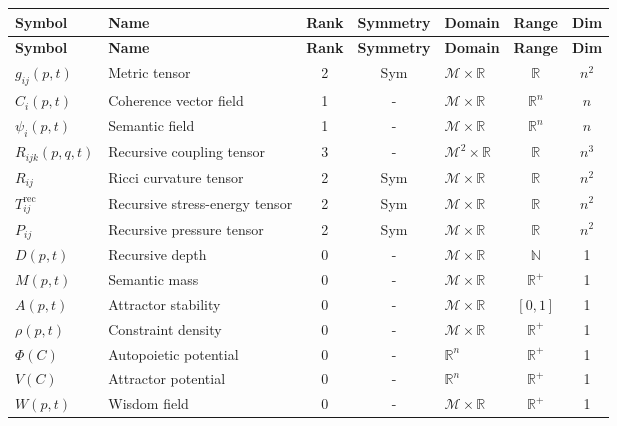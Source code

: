 {\footnotesize
\begin{longtable}{|p{2.5cm}|p{4cm}|c|c|p{2.5cm}|c|c|}
\hline
\textbf{Symbol} & \textbf{Name} & \textbf{Rank} & \textbf{Symmetry} & \textbf{Domain} & \textbf{Range} & \textbf{Dim} \\
\hline
\endfirsthead
\hline
\textbf{Symbol} & \textbf{Name} & \textbf{Rank} & \textbf{Symmetry} & \textbf{Domain} & \textbf{Range} & \textbf{Dim} \\
\hline
\endhead
\hline
\(g_{ij}(p,t)\) & Metric tensor & 2 & Sym & \(\mathcal{M} \times \mathbb{R}\) & \(\mathbb{R}\) & \(n^2\) \\
\hline
\(C_i(p,t)\) & Coherence vector field & 1 & - & \(\mathcal{M} \times \mathbb{R}\) & \(\mathbb{R}^n\) & \(n\) \\
\hline
\(\psi_i(p,t)\) & Semantic field & 1 & - & \(\mathcal{M} \times \mathbb{R}\) & \(\mathbb{R}^n\) & \(n\) \\
\hline
\(R_{ijk}(p,q,t)\) & Recursive coupling tensor & 3 & - & \(\mathcal{M}^2 \times \mathbb{R}\) & \(\mathbb{R}\) & \(n^3\) \\
\hline
\(R_{ij}\) & Ricci curvature tensor \autocite{RicciLeviCivita1901} & 2 & Sym & \(\mathcal{M} \times \mathbb{R}\) & \(\mathbb{R}\) & \(n^2\) \\
\hline
\(T_{ij}^{\text{rec}}\) & Recursive stress-energy tensor & 2 & Sym & \(\mathcal{M} \times \mathbb{R}\) & \(\mathbb{R}\) & \(n^2\) \\
\hline
\(P_{ij}\) & Recursive pressure tensor & 2 & Sym & \(\mathcal{M} \times \mathbb{R}\) & \(\mathbb{R}\) & \(n^2\) \\
\hline
\(D(p,t)\) & Recursive depth & 0 & - & \(\mathcal{M} \times \mathbb{R}\) & \(\mathbb{N}\) & 1 \\
\hline
\(M(p,t)\) & Semantic mass & 0 & - & \(\mathcal{M} \times \mathbb{R}\) & \(\mathbb{R}^+\) & 1 \\
\hline
\(A(p,t)\) & Attractor stability & 0 & - & \(\mathcal{M} \times \mathbb{R}\) & \([0,1]\) & 1 \\
\hline
\(\rho(p,t)\) & Constraint density & 0 & - & \(\mathcal{M} \times \mathbb{R}\) & \(\mathbb{R}^+\) & 1 \\
\hline
\(\Phi(C)\) & Autopoietic potential & 0 & - & \(\mathbb{R}^n\) & \(\mathbb{R}^+\) & 1 \\
\hline
\(V(C)\) & Attractor potential & 0 & - & \(\mathbb{R}^n\) & \(\mathbb{R}^+\) & 1 \\
\hline
\(W(p,t)\) & Wisdom field & 0 & - & \(\mathcal{M} \times \mathbb{R}\) & \(\mathbb{R}^+\) & 1 \\

\end{longtable}}

